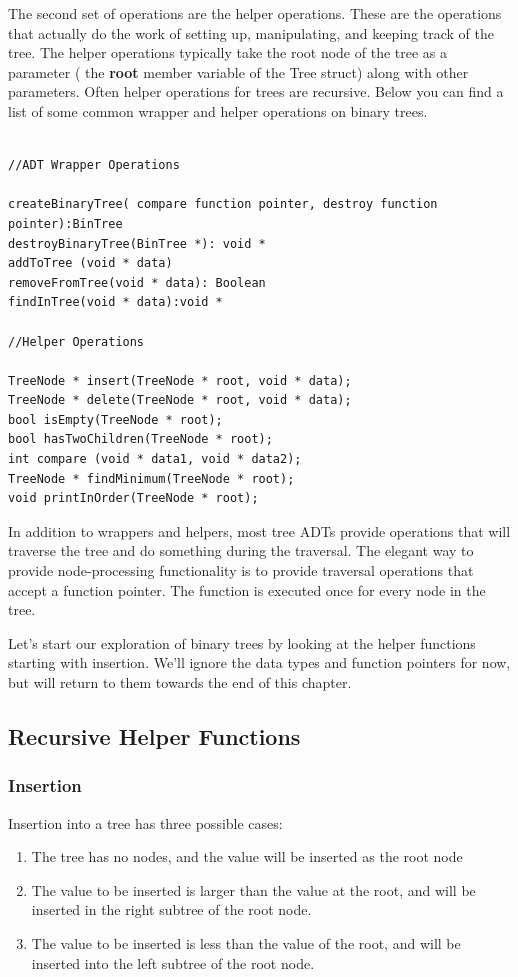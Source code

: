 The second set of operations are the helper
operations. These are the operations that actually do the work of
setting up, manipulating, and keeping track of the tree.  The helper operations typically take the root node of the tree as a parameter ( the \textbf{root} member variable of the Tree struct) along with other parameters.  Often helper operations for trees are recursive.
Below you can find a list of some common wrapper and helper operations on binary trees.

\begin{lstlisting}

//ADT Wrapper Operations

createBinaryTree( compare function pointer, destroy function pointer):BinTree
destroyBinaryTree(BinTree *): void *
addToTree (void * data)
removeFromTree(void * data): Boolean
findInTree(void * data):void *

//Helper Operations

TreeNode * insert(TreeNode * root, void * data);
TreeNode * delete(TreeNode * root, void * data);
bool isEmpty(TreeNode * root);
bool hasTwoChildren(TreeNode * root);
int compare (void * data1, void * data2);
TreeNode * findMinimum(TreeNode * root);
void printInOrder(TreeNode * root);
\end{lstlisting}

In addition to wrappers and helpers, most tree ADTs provide operations
that will traverse the tree and do something during the traversal. The
elegant way to provide node-processing functionality is to provide
traversal operations that accept a function pointer. The function is
executed once for every node in the tree.

Let's start our exploration of binary trees by looking at the helper
functions starting with insertion. We'll ignore the data types and
function pointers for now, but will return to them towards the end of
this chapter.

\subsection{Recursive Helper Functions}
\subsubsection{Insertion}

Insertion into a tree has three possible cases:

\begin{enumerate}
\item
  The tree has no nodes, and the value will be inserted as the root node
\item
  The value to be inserted is larger than the value at the root, and
  will be inserted in the right subtree of the root node.
\item
  The value to be inserted is less than the value of the root, and will
  be inserted into the left subtree of the root node.
\end{enumerate}

